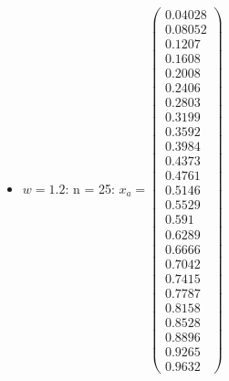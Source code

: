 \documentclass{udpreport}
\begin{document}
\begin{enumerate}
\begin {enumerate}
\begin{enumerate}
\begin{itemize}
\begin{itemize}
				\item $w = 1.2$:
				n = 25: $x_{a} = \left(\begin{array}{c} 0.04028\\ 0.08052\\ 0.1207\\ 0.1608\\ 0.2008\\ 0.2406\\ 0.2803\\ 0.3199\\ 0.3592\\ 0.3984\\ 0.4373\\ 0.4761\\ 0.5146\\ 0.5529\\ 0.591\\ 0.6289\\ 0.6666\\ 0.7042\\ 0.7415\\ 0.7787\\ 0.8158\\ 0.8528\\ 0.8896\\ 0.9265\\ 0.9632 \end{array}\right)$

\end{itemize}
\end{itemize}
\end{enumerate}
\end{enumerate}
\end{enumerate}
\end{document}
